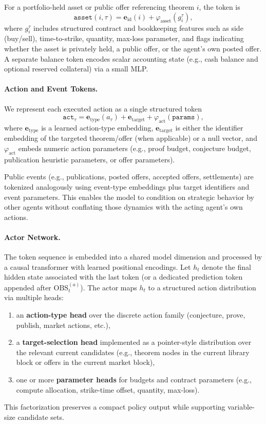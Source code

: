 \documentclass[letterpaper]{article} %
\renewcommand{\phi}{\varphi}
\begin{document}
For a portfolio-held asset or public offer referencing theorem $i$, the token is
\[
\texttt{asset}(i,\tau)=\mathbf{e}_{\mathrm{id}}(i)+\phi_{\mathrm{asset}}(g_i^\tau),
\]
where $g_i^\tau$ includes structured contract and bookkeeping features such as side (buy/sell), time-to-strike, quantity, max-loss parameter, and flags indicating whether the asset is privately held, a public offer, or the agent's own posted offer. A separate balance token encodes scalar accounting state (e.g., cash balance and optional reserved collateral) via a small MLP.

\paragraph{Action and Event Tokens.}
We represent each executed action as a single structured token
\[
\texttt{act}_\tau=\mathbf{e}_{\mathrm{type}}(a_\tau)+\mathbf{e}_{\mathrm{target}}+\phi_{\mathrm{act}}(\texttt{params}),
\]
where $\mathbf{e}_{\mathrm{type}}$ is a learned action-type embedding, $\mathbf{e}_{\mathrm{target}}$ is either the identifier embedding of the targeted theorem/offer (when applicable) or a null vector, and $\phi_{\mathrm{act}}$ embeds numeric action parameters (e.g., proof budget, conjecture budget, publication heuristic parameters, or offer parameters).

Public events (e.g., publications, posted offers, accepted offers, settlements) are tokenized analogously using event-type embeddings plus target identifiers and event parameters. This enables the model to condition on strategic behavior by other agents without conflating those dynamics with the acting agent's own actions.

\paragraph{Actor Network.}
The token sequence is embedded into a shared model dimension and processed by a causal transformer with learned positional encodings. Let $h_t$ denote the final hidden state associated with the last token (or a dedicated prediction token appended after $\mathrm{OBS}_t^{(a)}$). The actor maps $h_t$ to a structured action distribution via multiple heads:
\begin{enumerate}
    \item an \textbf{action-type head} over the discrete action family (conjecture, prove, publish, market actions, etc.),
    \item a \textbf{target-selection head} implemented as a pointer-style distribution over the relevant current candidates (e.g., theorem nodes in the current library block or offers in the current market block),
    \item one or more \textbf{parameter heads} for budgets and contract parameters (e.g., compute allocation, strike-time offset, quantity, max-loss).
\end{enumerate}
This factorization preserves a compact policy output while supporting variable-size candidate sets.
\end{document}
